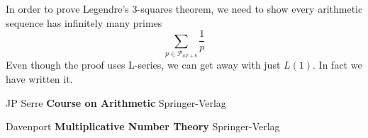\documentclass[12pt]{article}
\begin{document}
\noindent In order to prove Legendre's 3-squares theorem, we need to show every arithmetic sequence has infinitely many primes
$$ \sum_{p \in \mathcal{P}_{a\mathbb{Z}+b}} \frac{1}{p}$$
Even though the proof uses L-series, we can get away with just $L(1)$.  In fact we have written it.
\newline \newline

\newpage

\selectfont \fontsize{12}{10}\selectfont

\begin{thebibliography}{}

\item JP Serre \textbf{Course on Arithmetic} Springer-Verlag

\item Davenport \textbf{Multiplicative Number Theory} Springer-Verlag



\end{thebibliography}
\end{document}
